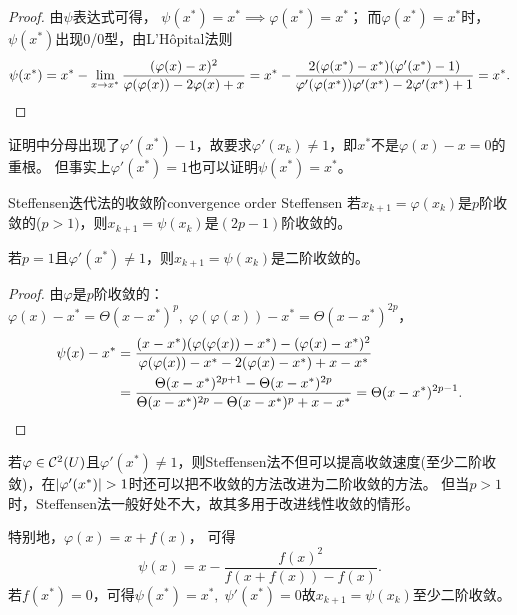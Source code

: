 \begin{proof}
    由$\psi$表达式可得，
    $\psi(x^*)=x^*\implies\varphi(x^*)=x^*$；
    而$\varphi(x^*)=x^*$时，$\psi(x^*)$出现0/0型，由L'H\^opital法则
    \[
        \psi(x^*)=x^*-\lim_{x\to x^*}\frac{(\varphi(x)-x)^2}{\varphi(\varphi(x))-2\varphi(x)+x}=x^*-\frac{2(\varphi(x^*)-x^*)(\varphi'(x^*)-1)}{\varphi'(\varphi(x^*))\varphi'(x^*)-2\varphi'(x^*)+1}=x^*.
        \qedhere
    \]
\end{proof}

\begin{remark}
    证明中分母出现了$\varphi'(x^*)-1$，故要求$\varphi'(x_k)\neq 1$，即$x^*$不是$\varphi(x)-x=0$的重根。
    但事实上$\varphi'(x^*)=1$也可以证明$\psi(x^*)=x^*$。
\end{remark}

\begin{theorem}
    {Steffensen迭代法的收敛阶}{convergence order Steffensen}
    若$x_{k+1}=\varphi(x_k)$是$p$阶收敛的($p>1)$，则$x_{k+1}=\psi(x_k)$是$(2p-1)$阶收敛的。

    若$p=1$且$\varphi'(x^*)\neq 1$，则$x_{k+1}=\psi(x_k)$是二阶收敛的。
\end{theorem}

\begin{proof}
    由$\varphi$是$p$阶收敛的：$\varphi(x)-x^*=\Theta(x-x^*)^p,\;\varphi(\varphi(x))-x^*=\Theta(x-x^*)^{2p}$，
    \begin{align*}
        \psi(x)-x^*&=\frac{(x-x^*)(\varphi(\varphi(x))-x^*)-(\varphi(x)-x^*)^2}{\varphi(\varphi(x))-x^*-2(\varphi(x)-x^*)+x-x^*}\\
        &=\frac{\Theta(x-x^*)^{2p+1}-\Theta(x-x^*)^{2p}}{\Theta(x-x^*)^{2p}-\Theta(x-x^*)^p+x-x^*}=\Theta(x-x^*)^{2p-1}.
        \qedhere
    \end{align*}
\end{proof}

\begin{remark}
    若$\varphi\in\mathcal C^2(U)$且$\varphi'(x^*)\neq 1$，则Steffensen法不但可以提高收敛速度(至少二阶收敛)，在$\left\lvert\varphi'(x^*)\right\rvert>1$时还可以把不收敛的方法改进为二阶收敛的方法。
    但当$p>1$时，Steffensen法一般好处不大，故其多用于改进线性收敛的情形。
\end{remark}

\begin{example}
    {}{}
    特别地，$\varphi(x)=x+f(x)$，
    可得
    \begin{equation}
        \psi(x)=x-\frac{f(x)^2}{f(x+f(x))-f(x)}.
    \end{equation}
    若$f(x^*)=0$，可得$\psi(x^*)=x^*,\;\psi'(x^*)=0$故$x_{k+1}=\psi(x_k)$至少二阶收敛。
\end{example}

